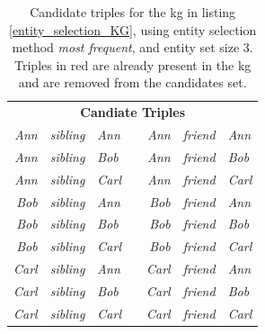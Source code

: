 \begin{table}[htbp]
\centering
\begin{tabular}{rcllrcl}
\multicolumn{7}{c}{\textbf{Candiate Triples}}                                                                                                                                                                                                       \\
\textit{Ann}                        & \textit{sibling}                        & \textit{Ann}                        &  & \textit{Ann}                        & \textit{friend}                        & \textit{Ann}                        \\
{\color[HTML]{CB0000} \textit{Ann}} & {\color[HTML]{CB0000} \textit{sibling}} & {\color[HTML]{CB0000} \textit{Bob}}   &  & \textit{Ann}                        & \textit{friend}                        & \textit{Bob}                          \\
{\color[HTML]{CB0000} \textit{Ann}} & {\color[HTML]{CB0000} \textit{sibling}} & {\color[HTML]{CB0000} \textit{Carl}} &  & {\color[HTML]{CB0000} \textit{Ann}} & {\color[HTML]{CB0000} \textit{friend}} & {\color[HTML]{CB0000} \textit{Carl}} \\
\textit{Bob}                          & \textit{sibling}                        & \textit{Ann}                        &  & \textit{Bob}                          & \textit{friend}                        & \textit{Ann}                        \\
\textit{Bob}                          & \textit{sibling}                        & \textit{Bob}                          &  & \textit{Bob}                          & \textit{friend}                        & \textit{Bob}                          \\
\textit{Bob}                          & \textit{sibling}                        & \textit{Carl}                        &  & {\color[HTML]{CB0000} \textit{Bob}}   & {\color[HTML]{CB0000} \textit{friend}} & {\color[HTML]{CB0000} \textit{Carl}} \\
\textit{Carl}                        & \textit{sibling}                        & \textit{Ann}                        &  & \textit{Carl}                        & \textit{friend}                        & \textit{Ann}                        \\
\textit{Carl}                        & \textit{sibling}                        & \textit{Bob}                          &  & \textit{Carl}                        & \textit{friend}                        & \textit{Bob}                          \\
\textit{Carl}                        & \textit{sibling}                        & \textit{Carl}                        &  & \textit{Carl}                        & \textit{friend}                        & \textit{Carl}                       
\end{tabular}
\caption[Candidate triples for example KG]{Candidate triples for the \gls{kg} in listing \ref{entity_selection_KG}, using entity selection method \textit{most frequent}, and entity set size 3. Triples in red are already present in the \gls{kg} and are removed from the candidates set.}
\label{canidate_triples_most_frequent}
\end{table}


